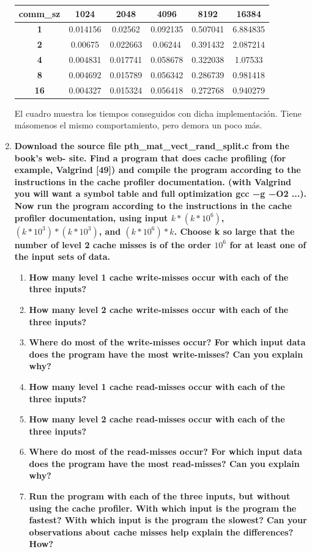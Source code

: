 \documentclass[a4paper,12pt]{article}
\begin{document}
\begin{enumerate}
\begin{center}
\begin{tabular}{|c|c|c|c|c|c|}\hline
\textbf{comm\_sz} & \textbf{1024} & \textbf{2048} & \textbf{4096} & \textbf{8192} & \textbf{16384}\\\hline
\textbf{1} & 0.014156 & 0.02562 & 0.092135 & 0.507041 & 6.884835\\\hline
\textbf{2} & 0.00675 & 0.022663 & 0.06244 & 0.391432 & 2.087214\\\hline
\textbf{4} & 0.004831 & 0.017741 & 0.058678 & 0.322038 & 1.07533\\\hline
\textbf{8} & 0.004692 & 0.015789 & 0.056342 & 0.286739 & 0.981418\\\hline
\textbf{16} & 0.004327 & 0.015324 & 0.056418 & 0.272768 & 0.940279\\\hline
\end{tabular}
\end{center}

El cuadro muestra los tiempos conseguidos con dicha implementación. Tiene másomenos el mismo comportamiento, pero demora un poco más.

\item{ \textbf{Download the source file pth\_mat\_vect\_rand\_split.c from the book’s web- site. Find a program that does
cache profiling (for example, Valgrind [49]) and compile the program according to the instructions in the cache profiler
documentation. (with Valgrind you will want a symbol table and full optimization gcc −g −O2 ...). Now run the program
according to the instructions in the cache profiler documentation, using input $k * (k * 10^{6})$, $(k * 10^{3}) * (k * 10^{3})$,
and $(k * 10^{6}) * k$. Choose k so large that the number of level 2 cache misses is of the order $10^{6}$ for at least
one of the input sets of data.}

\begin{enumerate}
 \item \textbf{How many level 1 cache write-misses occur with each of the three inputs?}
 \item \textbf{How many level 2 cache write-misses occur with each of the three inputs?}
 \item \textbf{Where do most of the write-misses occur? For which input data does the program have the most write-misses?
 Can you explain why?}
 \item \textbf{How many level 1 cache read-misses occur with each of the three inputs?}
 \item \textbf{How many level 2 cache read-misses occur with each of the three inputs?}
 \item \textbf{Where do most of the read-misses occur? For which input data does the program have the most read-misses?
 Can you explain why?}
 \item \textbf{Run the program with each of the three inputs, but without using the cache profiler. With which input is the
 program the fastest? With which input is the program the slowest? Can your observations about cache misses help explain the
 differences? How?}
\end{enumerate}
}


\end{enumerate}
\end{document}
